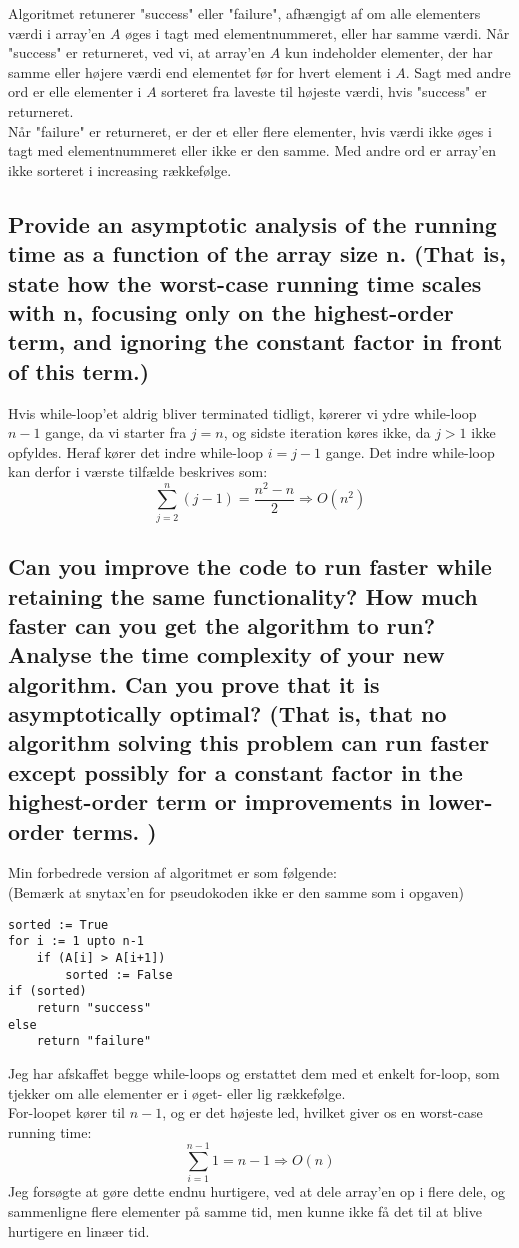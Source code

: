 \documentclass[a4paper,12pt]{article}
\begin{document}
Algoritmet retunerer "success" eller "failure", afhængigt af om alle elementers værdi i array'en $A$ øges i tagt med elementnummeret, eller har samme værdi.
Når "success" er returneret, ved vi, at array'en $A$ kun indeholder elementer, der har samme eller højere værdi end elementet før for hvert element i $A$. Sagt med andre ord er elle elementer i $A$ sorteret fra laveste til højeste værdi, hvis "success" er returneret.\\
Når "failure" er returneret, er der et eller flere elementer, hvis værdi ikke øges i tagt med elementnummeret eller ikke er den samme. Med andre ord er array'en ikke sorteret i increasing rækkefølge.
    
\subsection[]{Provide an asymptotic analysis of the running time as a function of the array size n. (That
is, state how the worst-case running time scales with n, focusing only on the highest-order
term, and ignoring the constant factor in front of this term.)}

Hvis while-loop'et aldrig bliver terminated tidligt, kørerer vi ydre while-loop $n-1$ gange, da vi starter fra $j = n$, og sidste iteration køres ikke, da $j > 1$ ikke opfyldes. Heraf kører det indre while-loop $i=j-1$ gange. Det indre while-loop kan derfor i værste tilfælde beskrives som:
\[\sum_{j=2}^{n}(j-1)=\dfrac{n^2-n}{2}\Rightarrow O(n^2)\]

\subsection[]{Can you improve the code to run faster while retaining the same functionality? How
much faster can you get the algorithm to run? Analyse the time complexity of your new
algorithm. Can you prove that it is asymptotically optimal? (That is, that no algorithm
solving this problem can run faster except possibly for a constant factor in the highest-order
term or improvements in lower-order terms. )}

Min forbedrede version af algoritmet er som følgende:\\
(Bemærk at snytax'en for pseudokoden ikke er den samme som i opgaven)
\begin{lstlisting}
sorted := True          
for i := 1 upto n-1     
    if (A[i] > A[i+1])  
        sorted := False 
if (sorted)             
    return "success"    
else                    
    return "failure"  
\end{lstlisting}
Jeg har afskaffet begge while-loops og erstattet dem med et enkelt for-loop, som tjekker om alle elementer er i øget- eller lig rækkefølge.\\
For-loopet kører til $n-1$, og er det højeste led, hvilket giver os en worst-case running time: 
\[\sum_{i=1}^{n-1}1=n-1\Rightarrow O(n)\]
Jeg forsøgte at gøre dette endnu hurtigere, ved at dele array'en op i flere dele, og sammenligne flere elementer på samme tid, men kunne ikke få det til at blive hurtigere en linæer tid.
\end{document}
